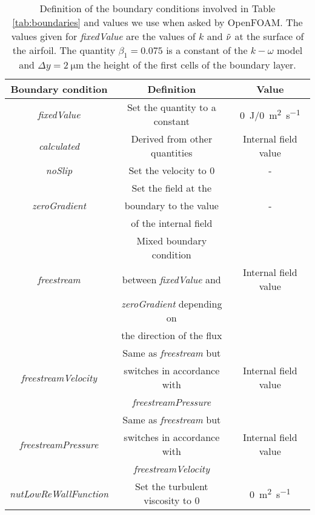 \begin{subappendices}
	\begin{table}
		\caption[Definition of boundary conditions.]{Definition of the boundary conditions involved in Table \ref{tab:boundaries} and values we use when asked by OpenFOAM. The values given for \emph{fixedValue} are the values of $k$ and $\Tilde{\nu}$ at the surface of the airfoil. The quantity $\beta_1 = 0.075$ is a constant of the $k-\omega$ model \cite{komega} and $\Delta y = \SI{2}{\micro\meter}$ the height of the first cells of the boundary layer.}
		\centering
		\begin{tabular}{ccc}
			\toprule
			Boundary condition & Definition & Value \\
			\midrule
			\emph{fixedValue} & Set the quantity to a constant & \SI{0}{\joule}/\SI{0}{\square\meter\per\second} \vspace{0.2cm} \\
			\emph{calculated} & Derived from other quantities & Internal field value \vspace{0.2cm} \\
			\emph{noSlip} & Set the velocity to 0 & - \vspace{0.2cm} \\
			& Set the field at the &  \\
			\emph{zeroGradient} & boundary to the value & - \\
			& of the internal field & \vspace{0.2cm} \\
			& Mixed boundary condition & \\
			\emph{freestream} & between \emph{fixedValue} and & Internal field value\\ 
			& \emph{zeroGradient} depending on & \\
			& the direction of the flux & \vspace{0.2cm} \\
			& Same as \emph{freestream} but & \\
			\emph{freestreamVelocity} & switches in accordance with & Internal field value\\ 
			& \emph{freestreamPressure} & \vspace{0.2cm} \\
			& Same as \emph{freestream} but & \\
			\emph{freestreamPressure} & switches in accordance with & Internal field value\\ 
			& \emph{freestreamVelocity} & \vspace{0.2cm} \\
			\emph{nutLowReWallFunction} & Set the turbulent viscosity to 0 & \SI{0}{\square\meter\per\second} \vspace{0.2cm} \\

\end{tabular}
\end{table}
\end{subappendices}
